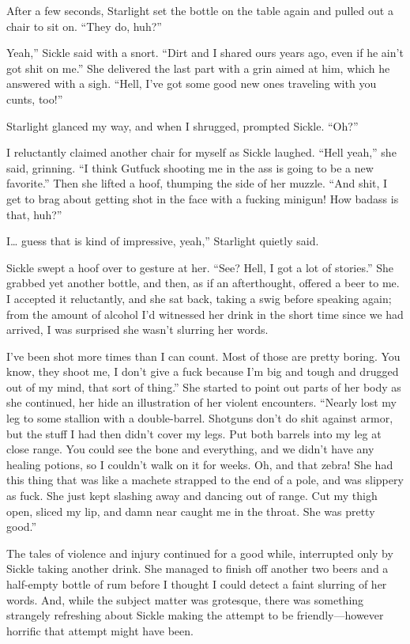 After a few seconds, Starlight set the bottle on the table again and pulled out a chair to sit on. “They do, huh?”

\leavevmode{}Yeah,” Sickle said with a snort. “Dirt and I shared ours years ago, even if he ain’t got shit on me.” She delivered the last part with a grin aimed at him, which he answered with a sigh. “Hell, I’ve got some good new ones traveling with you cunts, too!”

Starlight glanced my way, and when I shrugged, prompted Sickle. “Oh?”

I reluctantly claimed another chair for myself as Sickle laughed. “Hell yeah,” she said, grinning. “I think Gutfuck shooting me in the ass is going to be a new favorite.” Then she lifted a hoof, thumping the side of her muzzle. “And shit, I get to brag about getting shot in the face with a fucking minigun! How badass is that, huh?”

\leavevmode{}I… guess that is kind of impressive, yeah,” Starlight quietly said.

Sickle swept a hoof over to gesture at her. “See? Hell, I got a lot of stories.” She grabbed yet another bottle, and then, as if an afterthought, offered a beer to me. I accepted it reluctantly, and she sat back, taking a swig before speaking again; from the amount of alcohol I’d witnessed her drink in the short time since we had arrived, I was surprised she wasn’t slurring her words.

\leavevmode{}I’ve been shot more times than I can count. Most of those are pretty boring. You know, they shoot me, I don’t give a fuck because I’m big and tough and drugged out of my mind, that sort of thing.” She started to point out parts of her body as she continued, her hide an illustration of her violent encounters. “Nearly lost my leg to some stallion with a double-barrel. Shotguns don’t do shit against armor, but the stuff I had then didn’t cover my legs. Put both barrels into my leg at close range. You could see the bone and everything, and we didn’t have any healing potions, so I couldn’t walk on it for weeks. Oh, and that zebra! She had this thing that was like a machete strapped to the end of a pole, and was slippery as fuck. She just kept slashing away and dancing out of range. Cut my thigh open, sliced my lip, and damn near caught me in the throat. She was pretty good.”

The tales of violence and injury continued for a good while, interrupted only by Sickle taking another drink. She managed to finish off another two beers and a half-empty bottle of rum before I thought I could detect a faint slurring of her words. And, while the subject matter was grotesque, there was something strangely refreshing about Sickle making the attempt to be friendly—however horrific that attempt might have been.

